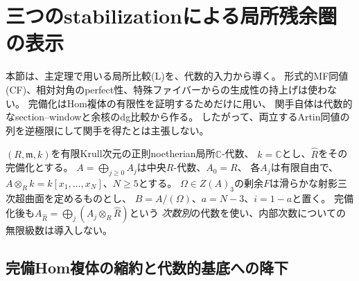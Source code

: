 \section{三つのstabilizationによる局所残余圏の表示}
\label{tw:sec:window}

本節は、主定理で用いる局所比較(L)を、代数的入力から導く。
形式的MF同値(CF)、相対対角のperfect性、特殊ファイバーからの生成性の持上げは使わない。
完備化はHom複体の有限性を証明するためだけに用い、
関手自体は代数的なsection--windowと余核のdg比較から作る。
したがって、両立するArtin同値の列を逆極限にして関手を得たとは主張しない。

$(R,\mathfrak m,k)$を有限Krull次元の正則noetherian局所$\mathbb C$-代数、
$k=\mathbb C$とし、$\widehat R$をその完備化とする。
$A=\bigoplus_{j\ge0}A_j$は中央$R$-代数、$A_0=R$、
各$A_j$は有限自由で、$A\otimes_R k=k[x_1,\ldots,x_N]$、$N\ge5$とする。
$\Omega\in Z(A)_3$の剰余$F$は滑らかな射影三次超曲面を定めるものとし、
$B=A/(\Omega)$、$a=N-3$、$i=1-a$と置く。
完備化後も$A_{\widehat R}=\bigoplus_j(A_j\otimes_R\widehat R)$という
\emph{次数別}の代数を使い、内部次数についての無限級数は導入しない。

\subsection{完備Hom複体の縮約と代数的基底への降下}

